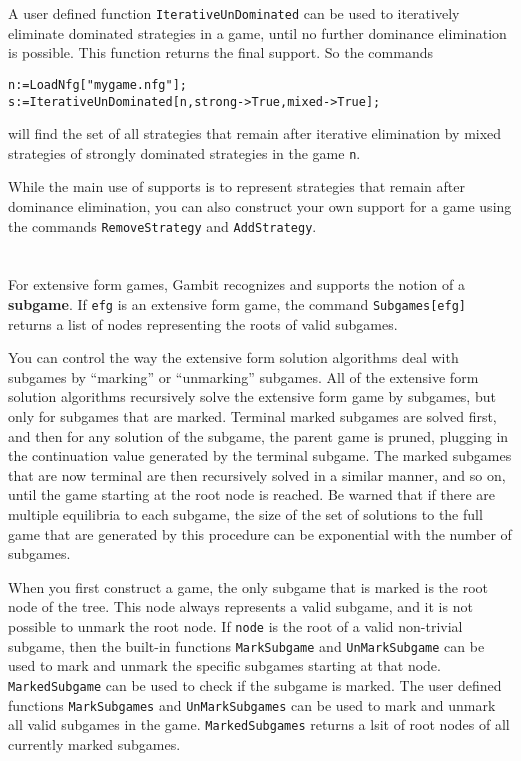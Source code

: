 A user defined function \texttt{IterativeUnDominated} can be used to
iteratively eliminate dominated strategies in a game, until no further
dominance elimination is possible.  This function returns the final
support.  So the commands

\begin{verbatim}
n:=LoadNfg["mygame.nfg"];
s:=IterativeUnDominated[n,strong->True,mixed->True];
\end{verbatim}

\noindent
will find the set of all strategies that remain after iterative
elimination by mixed strategies of strongly dominated strategies in
the game \verb+n+.

While the main use of supports is to represent strategies that
remain after dominance elimination, you can also construct your own
support for a game using the commands \texttt{RemoveStrategy} and
\texttt{AddStrategy}.

\section{}

For extensive form games, Gambit recognizes and supports the notion of
a {\bf subgame}.  If \verb+efg+ is an extensive form game, the
command \verb+Subgames[efg]+ returns a list of nodes
representing the roots of valid subgames.

You can control the way the extensive form solution algorithms deal
with subgames by ``marking'' or ``unmarking'' subgames.  All of the
extensive form solution algorithms recursively solve the extensive
form game by subgames, but only for subgames that are marked.  Terminal
marked subgames are solved first, and then for any solution of the
subgame, the parent game is pruned, plugging in the continuation value
generated by the terminal subgame.  The marked subgames that are now
terminal are then recursively solved in a similar manner, and so on,
until the game starting at the root node is reached.  Be warned that
if there are multiple equilibria to each subgame, the size of the set
of solutions to the full game that are generated by this procedure can
be exponential with the number of subgames.

When you first construct a game, the only subgame that is marked is
the root node of the tree.  This node always represents a valid
subgame, and it is not possible to unmark the root node.  If
\verb+node+ is the root of a valid non-trivial subgame, then the
built-in functions \texttt{MarkSubgame} and \texttt{UnMarkSubgame} can be
used to mark and unmark the specific subgames starting at that node.
\texttt{MarkedSubgame} can be used to check if the subgame is marked.
The user defined functions \texttt{MarkSubgames} and
\texttt{UnMarkSubgames} can be used to mark and unmark all valid
subgames in the game.  \texttt{MarkedSubgames} returns a lsit of root
nodes of all currently marked subgames.

